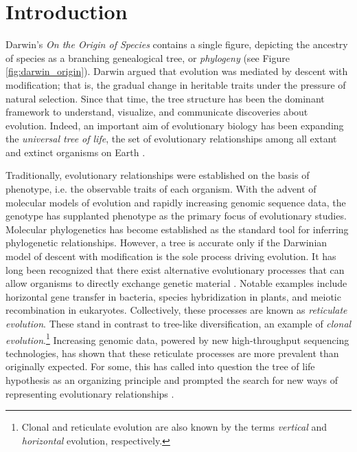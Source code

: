 \chapter{Introduction}
\label{ch:introduction}


Darwin's \emph{On the Origin of Species} contains a single figure, depicting the ancestry of species as a branching genealogical tree, or \emph{phylogeny} \cite{Darwin:1859uh} (see Figure \ref{fig:darwin_origin}).
Darwin argued that evolution was mediated by descent with modification; that is, the gradual change in heritable traits under the pressure of natural selection.
Since that time, the tree structure has been the dominant framework to understand, visualize, and communicate discoveries about evolution.
Indeed, an important aim of evolutionary biology has been expanding the \emph{universal tree of life}, the set of evolutionary relationships among all extant and extinct organisms on Earth \cite{Bowler:2003uz}.

Traditionally, evolutionary relationships were established on the basis of phenotype, i.e. the observable traits of each organism.
With the advent of molecular models of evolution and rapidly increasing genomic sequence data, the genotype has supplanted phenotype as the primary focus of evolutionary studies.
Molecular phylogenetics has become established as the standard tool for inferring phylogenetic relationships.
However, a tree is accurate only if the Darwinian model of descent with modification is the sole process driving evolution.
It has long been recognized that there exist alternative evolutionary processes that can allow organisms to directly exchange genetic material \cite{Arnold:2007vq}.
Notable examples include horizontal gene transfer in bacteria, species hybridization in plants, and meiotic recombination in eukaryotes.
Collectively, these processes are known as \emph{reticulate evolution}.
These stand in contrast to tree-like diversification, an example of \emph{clonal evolution}.\footnote{Clonal and reticulate evolution are also known by the terms \emph{vertical} and \emph{horizontal} evolution, respectively.}
Increasing genomic data, powered by new high-throughput sequencing technologies, has shown that these reticulate processes are more prevalent than originally expected.
For some, this has called into question the tree of life hypothesis as an organizing principle and prompted the search for new ways of representing evolutionary relationships \cite{Doolittle:1999,OMalley:2011tu}.

